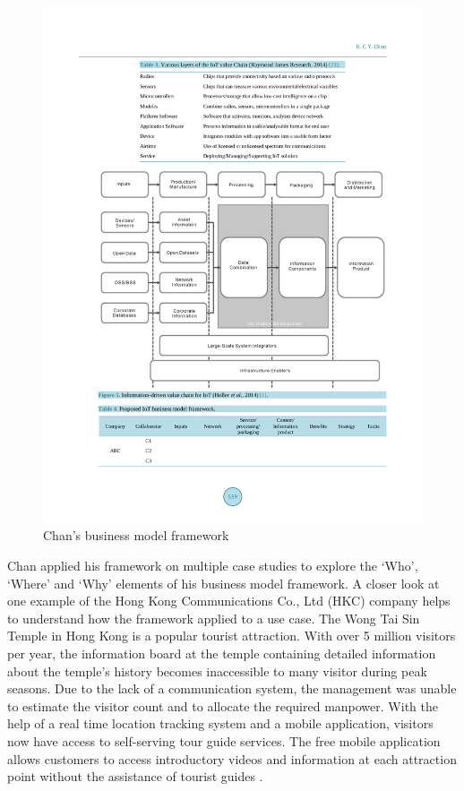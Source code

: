 		\begin{figure}[ht]
		    \begin{center}
		    \includegraphics[scale=1.0]{Talk11/chan.pdf}
		    \end{center}
		    \caption{Chan's business model framework \cite[p.~559]{chan}}
		    \label{fig:chan}
		\end{figure}

		Chan applied his framework on multiple case studies to explore the `Who', `Where' and `Why' elements of his business model framework. A closer look at one example of the Hong Kong Communications Co., Ltd (HKC) company helps to understand how the framework applied to a use case. The Wong Tai Sin Temple in Hong Kong is a popular tourist attraction. With over 5 million visitors per year, the information board at the temple containing detailed information about the temple's history becomes inaccessible to many visitor during peak seasons. Due to the lack of a communication system, the management was unable to estimate the visitor count and to allocate the required manpower. With the help of a real time location tracking system and a mobile application, visitors now have access to self-serving tour guide services. The free mobile application allows customers to access introductory videos and information at each attraction point without the assistance of tourist guides \cite[p.~560]{chan}. 

